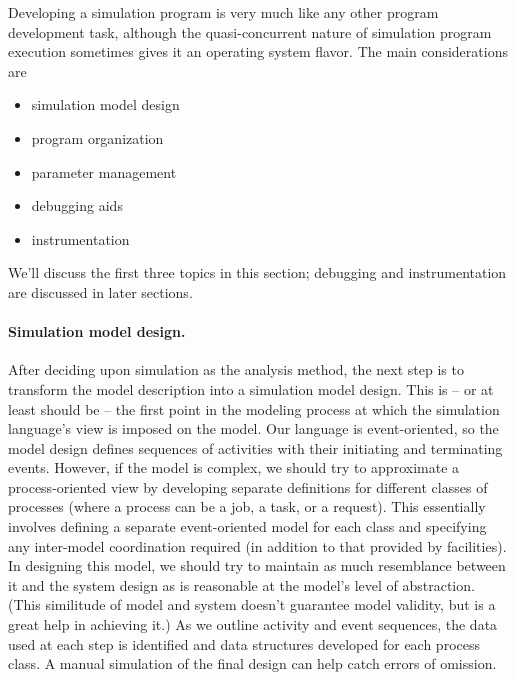 Developing a simulation program is very much like any other program
development task, although the quasi-concurrent nature of simulation program
execution sometimes gives it an operating system flavor. The main
considerations are

\begin{itemize}
\item simulation model design
\item program organization
\item parameter management
\item debugging aids
\item instrumentation
\end{itemize}

We'll discuss the first three topics in this section; debugging and
instrumentation are discussed in later sections.

\paragraph{Simulation model design.}
After deciding upon simulation as the analysis method, the next step is to
transform the model description into a simulation model design. This is -- or
at least should be -- the first point in the modeling process at which the
simulation language's view is imposed on the model. Our language is
event-oriented, so the model design defines sequences of activities with their
initiating and terminating events. However, if the model is complex, we
should try to approximate a process-oriented view by developing separate
definitions for different classes of processes (where a process can be a job, a
 task, or a request). This essentially involves defining a separate
 event-oriented model for each class and specifying any inter-model
coordination required (in addition to that provided by facilities). In
designing this model, we should try to maintain as much resemblance between
it and the system design as is reasonable at the model's level of abstraction.
(This similitude of model and system doesn't guarantee model validity, but is a
great help in achieving it.) As we outline activity and event sequences, the
data used at each step is identified and data structures developed for each
process class. A manual simulation of the final design can help catch errors
of omission.

